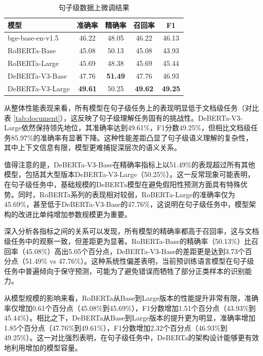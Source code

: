 \begin{table}[htbp]
\caption{句子级数据上微调结果}
\centering
\begin{tabular}{l|cccc}
\toprule
\textbf{模型}& \textbf{准确率}   & \textbf{精确率}    & \textbf{召回率}    & \textbf{F1}   \\ \midrule
bge-base-en-v1.5  \cite{bge_embedding}   & 46.22          & 48.05          & 46.22          & 46.13          \\
RoBERTa-Base \cite{liu_roberta_2019}     & 45.08          & 50.13          & 45.08          & 43.93          \\
RoBERTa-Large \cite{liu_roberta_2019}    & 45.69          & 48.38          & 45.69          & 45.44          \\
DeBERTa-V3-Base \cite{he2023debertav3improvingdebertausing} & 47.76          & \textbf{51.49} & 47.76          & 46.93          \\
DeBERTa-V3-Large \cite{he2023debertav3improvingdebertausing} & \textbf{49.61} & 50.25          & \textbf{49.62} & \textbf{49.25} \\ \bottomrule
\end{tabular}
\label{tab:sentence}
\end{table}

从整体性能表现来看，所有模型在句子级任务上的表现明显低于文档级任务（对比表 \ref{tab:document}），这反映了句子级理解任务固有的挑战性。DeBERTa-V3-Large依然保持领先地位，其准确率达到49.61\%，F1分数49.25\%，但相比文档级任务85.97\%的准确率有显著下降。这种性能差距凸显了句子级语义理解的复杂性，其中上下文信息有限，模型更难捕捉深层次的语义关系。

值得注意的是，DeBERTa-V3-Base在精确率指标上以51.49\%的表现超过所有其他模型，包括其大型版本DeBERTa-V3-Large（50.25\%）。这一反常现象可能表明，在句子级任务中，基础规模的DeBERTa模型在避免假阳性预测方面具有特殊优势。同时，RoBERTa系列的表现相对较弱，RoBERTa-Large的准确率仅为45.69\%，甚至低于DeBERTa-V3-Base的47.76\%，这说明在句子级任务中，模型架构的改进比单纯增加参数规模更为重要。

深入分析各指标之间的关系可以发现，所有模型的精确率都高于召回率，这与文档级任务中的观察一致，但差距更为显著。RoBERTa-Base的精确率（50.13\%）比召回率（45.08\%）高出5.05个百分点，DeBERTa-V3-Base的差距更是达到3.73个百分点（51.49\% vs 47.76\%）。这种系统性偏差表明，当前预训练语言模型在句子级任务中普遍倾向于保守预测，可能为了避免错误而牺牲了部分正类样本的识别能力。

从模型规模的影响来看，RoBERTa从Base到Large版本的性能提升非常有限，准确率仅增加0.61个百分点（45.08\%到45.69\%），F1分数增加1.51个百分点（43.93\%到45.44\%）。相比之下，DeBERTa从Base到Large版本的提升更为明显，准确率增加1.85个百分点（47.76\%到49.61\%），F1分数增加2.32个百分点（46.93\%到49.25\%）。这一对比强烈表明，在句子级任务中，DeBERTa的架构设计能够更有效地利用增加的模型容量。


